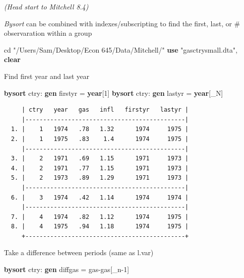 \documentclass[
]{book}
\newenvironment{Shaded}{\begin{snugshade}}{\end{snugshade}}
\newcommand{\DataTypeTok}[1]{\textcolor[rgb]{0.13,0.29,0.53}{#1}}
\newcommand{\FunctionTok}[1]{\textcolor[rgb]{0.13,0.29,0.53}{\textbf{#1}}}
\newcommand{\KeywordTok}[1]{\textcolor[rgb]{0.13,0.29,0.53}{\textbf{#1}}}
\newcommand{\NormalTok}[1]{#1}
\newcommand{\StringTok}[1]{\textcolor[rgb]{0.31,0.60,0.02}{#1}}
\begin{document}
\emph{(Head start to Mitchell 8.4)}

\emph{Bysort} can be combined with indexes/subscripting to find the first, last, or \#
observaration within a group

\begin{Shaded}
\begin{Highlighting}[]
\NormalTok{cd }\StringTok{"/Users/Sam/Desktop/Econ 645/Data/Mitchell/"}
\KeywordTok{use} \StringTok{"gasctrysmall.dta"}\NormalTok{, }\KeywordTok{clear}
\end{Highlighting}
\end{Shaded}

Find first year and last year

\begin{Shaded}
\begin{Highlighting}[]
\KeywordTok{bysort}\NormalTok{ ctry: }\KeywordTok{gen}\NormalTok{ firstyr = }\FunctionTok{year}\NormalTok{[1]}
\KeywordTok{bysort}\NormalTok{ ctry: }\KeywordTok{gen}\NormalTok{ lastyr = }\FunctionTok{year}\NormalTok{[\_N]}
\end{Highlighting}
\end{Shaded}

\begin{verbatim}
     | ctry   year   gas   infl   firstyr   lastyr |
     |---------------------------------------------|
  1. |    1   1974   .78   1.32      1974     1975 |
  2. |    1   1975   .83    1.4      1974     1975 |
     |---------------------------------------------|
  3. |    2   1971   .69   1.15      1971     1973 |
  4. |    2   1971   .77   1.15      1971     1973 |
  5. |    2   1973   .89   1.29      1971     1973 |
     |---------------------------------------------|
  6. |    3   1974   .42   1.14      1974     1974 |
     |---------------------------------------------|
  7. |    4   1974   .82   1.12      1974     1975 |
  8. |    4   1975   .94   1.18      1974     1975 |
     +---------------------------------------------+
\end{verbatim}

Take a difference between periods (same as l.var)

\begin{Shaded}
\begin{Highlighting}[]
\KeywordTok{bysort}\NormalTok{ ctry: }\KeywordTok{gen}\NormalTok{ diffgas = gas{-}gas[}\DataTypeTok{\_n}\NormalTok{{-}1]}
\end{Highlighting}
\end{Shaded}
\end{document}
